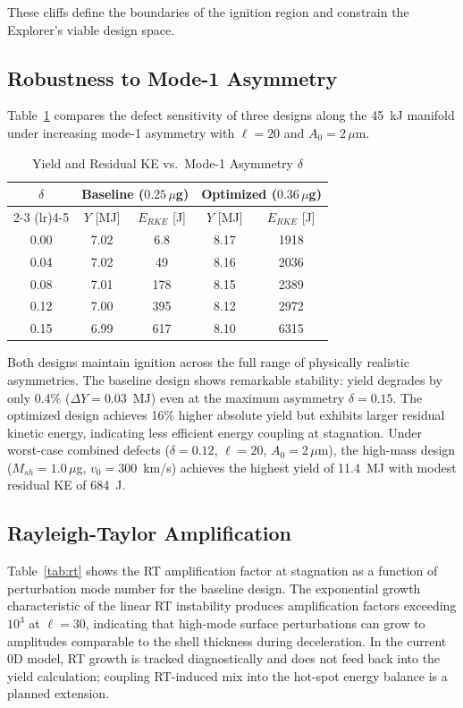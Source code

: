 \documentclass[conference]{IEEEtran}
\begin{document}
These cliffs define the boundaries of the ignition region and constrain the Explorer's viable design space.

\subsection{Robustness to Mode-1 Asymmetry}

Table~\ref{tab:delta} compares the defect sensitivity of three designs along the 45~kJ manifold under increasing mode-1 asymmetry with $\ell = 20$ and $A_0 = 2\,\mu$m.

\begin{table}[htbp]
\caption{Yield and Residual KE vs.\ Mode-1 Asymmetry $\delta$}
\label{tab:delta}
\centering
\begin{tabular}{ccccc}
\toprule
\multirow{2}{*}{$\delta$} & \multicolumn{2}{c}{Baseline ($0.25\,\mu$g)} & \multicolumn{2}{c}{Optimized ($0.36\,\mu$g)} \\
\cmidrule(lr){2-3} \cmidrule(lr){4-5}
& $Y$ [MJ] & $E_{RKE}$ [J] & $Y$ [MJ] & $E_{RKE}$ [J] \\
\midrule
0.00 & 7.02 & 6.8 & 8.17 & 1918 \\
0.04 & 7.02 & 49 & 8.16 & 2036 \\
0.08 & 7.01 & 178 & 8.15 & 2389 \\
0.12 & 7.00 & 395 & 8.12 & 2972 \\
0.15 & 6.99 & 617 & 8.10 & 6315 \\
\bottomrule
\end{tabular}
\end{table}

Both designs maintain ignition across the full range of physically realistic asymmetries.  The baseline design shows remarkable stability: yield degrades by only 0.4\% ($\Delta Y = 0.03$~MJ) even at the maximum asymmetry $\delta = 0.15$.  The optimized design achieves 16\% higher absolute yield but exhibits larger residual kinetic energy, indicating less efficient energy coupling at stagnation.  Under worst-case combined defects ($\delta = 0.12$, $\ell = 20$, $A_0 = 2\,\mu$m), the high-mass design ($M_{sh} = 1.0\,\mu$g, $v_0 = 300$~km/s) achieves the highest yield of 11.4~MJ with modest residual KE of 684~J.

\subsection{Rayleigh-Taylor Amplification}

Table~\ref{tab:rt} shows the RT amplification factor at stagnation as a function of perturbation mode number for the baseline design.  The exponential growth characteristic of the linear RT instability produces amplification factors exceeding $10^3$ at $\ell = 30$, indicating that high-mode surface perturbations can grow to amplitudes comparable to the shell thickness during deceleration.  In the current 0D model, RT growth is tracked diagnostically and does not feed back into the yield calculation; coupling RT-induced mix into the hot-spot energy balance is a planned extension.
\end{document}
